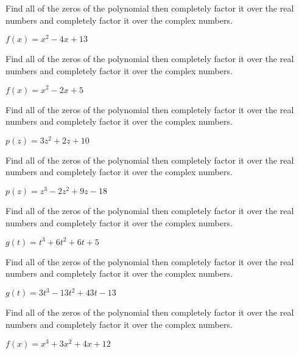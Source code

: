 \documentclass{ximera}
\begin{document}
	\author{Stitz-Zeager}




\begin{problem}\label{compfactpolyfirst}
Find all of the zeros of the polynomial then completely factor it over the real numbers and completely factor it over the complex numbers.

$f(x) = x^{2} - 4x + 13$ 
\end{problem}

\begin{problem}
Find all of the zeros of the polynomial then completely factor it over the real numbers and completely factor it over the complex numbers.

$f(x) = x^2 - 2x + 5$
\end{problem}

\begin{problem}
Find all of the zeros of the polynomial then completely factor it over the real numbers and completely factor it over the complex numbers.

$p(z) = 3z^{2} + 2z + 10$
\end{problem}

\begin{problem}
Find all of the zeros of the polynomial then completely factor it over the real numbers and completely factor it over the complex numbers.

$p(z) = z^3-2z^2+9z-18$
\end{problem}

\begin{problem}
Find all of the zeros of the polynomial then completely factor it over the real numbers and completely factor it over the complex numbers.

$g(t) = t^{3} + 6t^{2} + 6t + 5$
\end{problem}

\begin{problem}
Find all of the zeros of the polynomial then completely factor it over the real numbers and completely factor it over the complex numbers.

$g(t) = 3t^{3} - 13t^{2} + 43t - 13$
\end{problem}

\begin{problem}
Find all of the zeros of the polynomial then completely factor it over the real numbers and completely factor it over the complex numbers.

$f(x) = x^3 + 3x^2 + 4x + 12$
\end{problem}
\end{document}
